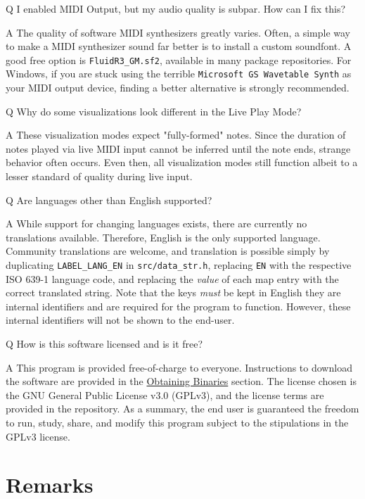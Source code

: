 \documentclass[english]{article}
\newcommand\faqQ[1]{%
  \leavevmode\par
  \noindent
{\hspace{4pt}\Large Q} \raisebox{0.1em}{\textendash{}} {\large #1}\par \vspace{-0.5em}}
\newcommand\faqA[2][]{%
  \leavevmode\par\noindent
  {\leftskip30pt
  {\large A} \raisebox{0.05em}{\textendash{}} \textbf{#1}#2\par \vspace{-0.25em}}}
\providecommand{\mi}[1]{\texttt{#1}}
\begin{document}
\faqQ{I enabled MIDI Output, but my audio quality is subpar. How can I fix this?}

\faqA{The quality of software MIDI synthesizers greatly varies. Often, a simple way to make a MIDI synthesizer sound
far better is to install a custom soundfont. A good free option is \mi{FluidR3_GM.sf2}, available in many
package repositories. For Windows, if you are stuck using the terrible \mi{Microsoft GS Wavetable Synth} as your
MIDI output device, finding a better alternative is strongly recommended.}

\faqQ{Why do some visualizations look different in the Live Play Mode?}

\faqA{These visualization modes expect "fully-formed" notes.
Since the duration of notes played via live MIDI input cannot be inferred until the note ends, 
strange behavior often occurs. Even then,
all visualization modes still function \textendash{} albeit to a lesser standard of quality \textendash{} during live input. 
}

\faqQ{Are languages other than English supported?}

\faqA{While support for changing languages exists, there are currently no translations available. Therefore,
English is the only supported language. Community translations are welcome, and translation is possible simply by
duplicating \mi{LABEL_LANG_EN} in \mi{src/data_str.h}, replacing \mi{EN} with the respective ISO 639-1 language code,
and replacing the \textit{value} of each map entry with the correct translated string. Note that the keys \textit{must} be
kept in English \textendash{} they are internal identifiers and are required for the program to function. However, these internal
identifiers will not be shown to the end-user.}

\faqQ{How is this software licensed and is it free?}

\faqA{This program is provided free-of-charge to everyone. Instructions to download the software are provided in the
\textcolor{lcol}{\hyperref[sec:obtain]{Obtaining Binaries}} section. The license chosen is the GNU General 
Public License v3.0 (GPLv3), and the license terms are provided in the repository. As a summary, the end user is 
guaranteed the freedom to run, study, share, and modify this program subject to the stipulations in the GPLv3 license.}


\section{Remarks}
\end{document}
